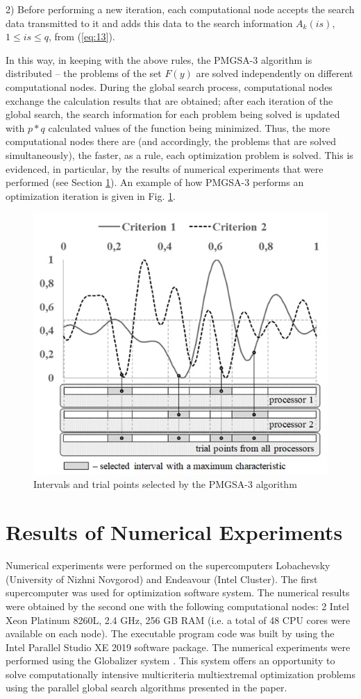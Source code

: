 \documentclass[review]{elsarticle}
\begin{document}
2) Before performing a new iteration, each computational node accepts the search data transmitted to it and adds this data to the search information $A_k (is)$, $1\leq is \leq q$, from (\ref{eq:13}).
	
In this way, in keeping with the above rules, the PMGSA-3 algorithm is distributed -- the problems of the set $F(y)$ are solved independently on different computational nodes. During the global search process, computational nodes exchange the calculation results that are obtained; after each iteration of the global search, the search information for each problem being solved is updated with $p*q$ calculated values of the function being minimized. Thus, the more computational nodes there are (and accordingly, the problems that are solved simultaneously), the faster, as a rule, each optimization problem is solved. This is evidenced, in particular, by the results of numerical experiments that were performed (see Section \ref{sec:5}). An example of how PMGSA-3 performs an optimization iteration is given in Fig. \ref{fig:4}.

\begin{figure}
  \centering
  \includegraphics[width=0.7\linewidth]{fig4}
  \caption{Intervals and trial points selected by the PMGSA-3 algorithm}
  \label{fig:4}
\end{figure}

\section{Results of Numerical Experiments}\label{sec:5}

Numerical experiments were performed on the supercomputers Lobachevsky (University of Nizhni Novgorod) and Endeavour (Intel Cluster). The first supercomputer was used for optimization software system. The numerical results were obtained by the second one with the following computational nodes: 2 Intel Xeon Platinum 8260L, 2.4 GHz, 256 GB RAM (i.e. a total of 48 CPU cores were available on each node). The executable program code was built by using the Intel Parallel Studio XE 2019 software package. The numerical experiments were performed using the Globalizer system \cite{c36}. This system offers an opportunity to solve computationally intensive multicriteria multiextremal optimization problems using the parallel global search algorithms presented in the paper.
\end{document}
